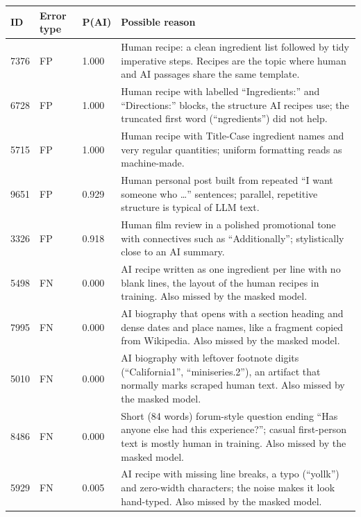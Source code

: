 \begin{tabularx}{\linewidth}{@{}p{0.64in}p{0.70in}p{0.98in}Y@{}}\toprule ID & Error type & P(AI) & Possible reason \\ \midrule
\mbox{7376} & FP & 1.000 & Human recipe: a clean ingredient list followed by tidy imperative steps. Recipes are the topic where human and AI passages share the same template. \\
\mbox{6728} & FP & 1.000 & Human recipe with labelled ``Ingredients:'' and ``Directions:'' blocks, the structure AI recipes use; the truncated first word (``ngredients'') did not help. \\
\mbox{5715} & FP & 1.000 & Human recipe with Title-Case ingredient names and very regular quantities; uniform formatting reads as machine-made. \\
\mbox{9651} & FP & 0.929 & Human personal post built from repeated ``I want someone who \ldots'' sentences; parallel, repetitive structure is typical of LLM text. \\
\mbox{3326} & FP & 0.918 & Human film review in a polished promotional tone with connectives such as ``Additionally''; stylistically close to an AI summary. \\
\mbox{5498} & FN & 0.000 & AI recipe written as one ingredient per line with no blank lines, the layout of the human recipes in training. Also missed by the masked model. \\
\mbox{7995} & FN & 0.000 & AI biography that opens with a section heading and dense dates and place names, like a fragment copied from Wikipedia. Also missed by the masked model. \\
\mbox{5010} & FN & 0.000 & AI biography with leftover footnote digits (``California1'', ``miniseries.2''), an artifact that normally marks scraped human text. Also missed by the masked model. \\
\mbox{8486} & FN & 0.000 & Short (84 words) forum-style question ending ``Has anyone else had this experience?''; casual first-person text is mostly human in training. Also missed by the masked model. \\
\mbox{5929} & FN & 0.005 & AI recipe with missing line breaks, a typo (``yollk'') and zero-width characters; the noise makes it look hand-typed. Also missed by the masked model. \\
\bottomrule\end{tabularx}

